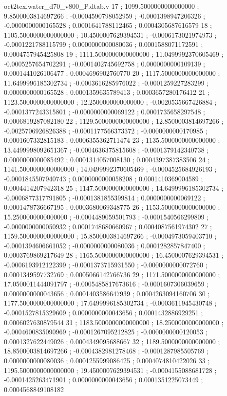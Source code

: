 \begin{filecontents}[overwrite]{oct2tex.water_d70_v800_P.dtab.v}
17 ; 1099.5000000000000000 ; 9.8500003814697266 ; -0.0004590798052959 ; -0.0001398947206326 ; -0.0000000000165528 ; 0.0001641788112465 ; 0.0004305687616579
18 ; 1105.5000000000000000 ; 10.4500007629394531 ; -0.0006173021974973 ; -0.0001221788115799 ; 0.0000000000080036 ; 0.0001588071172591 ; 0.0004757945425808
19 ; 1111.5000000000000000 ; 11.0499992370605469 ; -0.0005257654702291 ; -0.0001402745692758 ; 0.0000000000109139 ; 0.0001441026106477 ; 0.0004696902760770
20 ; 1117.5000000000000000 ; 11.6499996185302734 ; -0.0003616285976022 ; -0.0001259227283299 ; 0.0000000000165528 ; 0.0001359635789413 ; 0.0003657280176412
21 ; 1123.5000000000000000 ; 12.2500000000000000 ; -0.0020535667426884 ; -0.0001377243315801 ; -0.0000000000069122 ; 0.0001735658297548 ; 0.0006819287082180
22 ; 1129.5000000000000000 ; 12.8500003814697266 ; -0.0025706926826388 ; -0.0001177566373372 ; -0.0000000000170985 ; 0.0001607332815183 ; 0.0006355362711474
23 ; 1135.5000000000000000 ; 13.4499998092651367 ; -0.0004636375815608 ; -0.0001379142340738 ; 0.0000000000085492 ; 0.0001314057008130 ; 0.0004397387383506
24 ; 1141.5000000000000000 ; 14.0499992370605469 ; -0.0004525684926193 ; -0.0001845507940743 ; 0.0000000000058208 ; 0.0001410369004589 ; 0.0004414207942318
25 ; 1147.5000000000000000 ; 14.6499996185302734 ; -0.0006877317791805 ; -0.0001381855399814 ; 0.0000000000069122 ; 0.0001478736667195 ; 0.0003680069348775
26 ; 1153.5000000000000000 ; 15.2500000000000000 ; -0.0004489059501793 ; -0.0001540566299809 ; -0.0000000000050932 ; 0.0001748680660967 ; 0.0004087561974302
27 ; 1159.5000000000000000 ; 15.8500003814697266 ; -0.0004973059403710 ; -0.0001394606661052 ; -0.0000000000080036 ; 0.0001282857847400 ; 0.0003769869217649
28 ; 1165.5000000000000000 ; 16.4500007629394531 ; -0.0006193912122399 ; -0.0001373715931550 ; -0.0000000000072760 ; 0.0001349597732769 ; 0.0005066142766736
29 ; 1171.5000000000000000 ; 17.0500011444091797 ; -0.0005485817673616 ; -0.0001607306039659 ; 0.0000000000043656 ; 0.0001403586647939 ; 0.0004263094160706
30 ; 1177.5000000000000000 ; 17.6499996185302734 ; -0.0003611945430748 ; -0.0001527815329609 ; 0.0000000000043656 ; 0.0001432886929251 ; 0.0006027630879544
31 ; 1183.5000000000000000 ; 18.2500000000000000 ; -0.0004600835090969 ; -0.0001267095212825 ; -0.0000000000120053 ; 0.0001327622449026 ; 0.0004349095688667
32 ; 1189.5000000000000000 ; 18.8500003814697266 ; -0.0004382981278468 ; -0.0001287985505769 ; 0.0000000000080036 ; 0.0001255999086425 ; 0.0004074810422026
33 ; 1195.5000000000000000 ; 19.4500007629394531 ; -0.0004155088681728 ; -0.0001425263471901 ; 0.0000000000043656 ; 0.0001351225073449 ; 0.0004568849108182

\end{filecontents}

